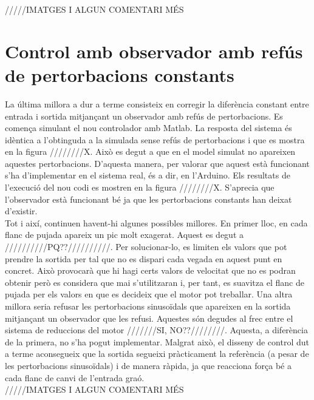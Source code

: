 \documentclass[]{article}
\begin{document}
/////IMATGES I ALGUN COMENTARI MÉS


\section{Control amb observador amb refús de pertorbacions constants}

La última millora a dur a terme consisteix en corregir la diferència constant entre entrada i sortida mitjançant un observador amb refús de pertorbacions. Es comença simulant el nou controlador amb Matlab. La resposta del sistema és idèntica a l'obtinguda a la simulada sense refús de pertorbacions i que es mostra en la figura ////////X. Això es degut a que en el model simulat no apareixen aquestes pertorbacions. D'aquesta manera, per valorar que aquest està funcionant s'ha d'implementar en el sistema real, és a dir, en l'Arduino. Els resultats de l'execució del nou codi es mostren en la figura ////////X. S'aprecia que l'observador està funcionant bé ja que les pertorbacions constants han deixat d'existir. \\

Tot i així, continuen havent-hi algunes possibles millores. En primer lloc, en cada flanc de pujada apareix un pic molt exagerat. Aquest es degut a //////////PQ??//////////. Per solucionar-lo, es limiten els valors que pot prendre la sortida per tal que no es dispari cada vegada en aquest punt en concret. Això provocarà que hi hagi certs valors de velocitat que no es podran obtenir però es considera que mai s'utilitzaran i, per tant, es suavitza el flanc de pujada per els valors en que es decideix que el motor pot treballar. Una altra millora seria refusar les pertorbacions sinusoïdals que apareixen en la sortida mitjançant un observador que les refusi. Aquestes són degudes al frec entre el sistema de reduccions del motor ///////SI, NO??////////. Aquesta, a diferència de la primera, no s'ha pogut implementar. Malgrat això, el disseny de control dut a terme aconsegueix que la sortida segueixi pràcticament la referència (a pesar de les pertorbacions sinusoïdals) i de manera ràpida, ja que reacciona força bé a cada flanc de canvi de l'entrada graó. \\ 

/////IMATGES I ALGUN COMENTARI MÉS
\end{document}
